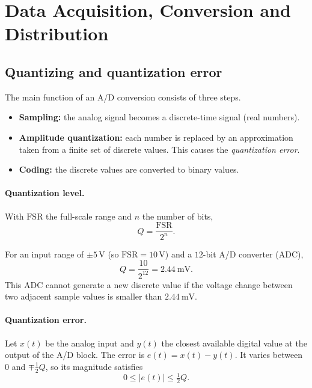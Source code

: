 \section{Data Acquisition, Conversion and Distribution}\label{sec:acq}

\subsection{Quantizing and quantization error}
The main function of an A/D conversion consists of three steps.
\begin{itemize}
  \item \textbf{Sampling:} the analog signal becomes a discrete-time signal (real numbers).
  \item \textbf{Amplitude quantization:} each number is replaced by an approximation taken from a finite
        set of discrete values. This causes the \emph{quantization error}.
  \item \textbf{Coding:} the discrete values are converted to binary values.
\end{itemize}

\paragraph{Quantization level.} With $\mathrm{FSR}$ the full-scale range and $n$ the number of bits,
\begin{equation}
  Q=\frac{\mathrm{FSR}}{2^{n}} .
\end{equation}

\begin{example}
For an input range of $\pm5\,\mathrm{V}$ (so $\mathrm{FSR}=10\,\mathrm{V}$) and a $12$-bit A/D converter (ADC),
\[
  Q=\frac{10}{2^{12}}=2.44\ \mathrm{mV}.
\]
This ADC cannot generate a new discrete value if the voltage change between two adjacent sample values is
smaller than $2.44\ \mathrm{mV}$.
\end{example}

\paragraph{Quantization error.} Let $x(t)$ be the analog input and $y(t)$ the closest available digital
value at the output of the A/D block. The error is $e(t)=x(t)-y(t)$. It varies between $0$ and $\mp\tfrac12 Q$,
so its magnitude satisfies
\begin{equation}
  0\le \lvert e(t)\rvert\le \tfrac12 Q .
\end{equation}

